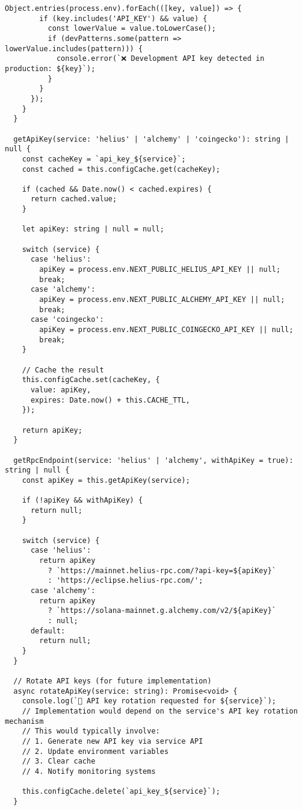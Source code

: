 \documentclass[11pt,a4paper]{article}
\begin{document}
\begin{lstlisting}[style=env, caption=API Key Security Best Practices]
      Object.entries(process.env).forEach(([key, value]) => {
        if (key.includes('API_KEY') && value) {
          const lowerValue = value.toLowerCase();
          if (devPatterns.some(pattern => lowerValue.includes(pattern))) {
            console.error(`❌ Development API key detected in production: ${key}`);
          }
        }
      });
    }
  }
  
  getApiKey(service: 'helius' | 'alchemy' | 'coingecko'): string | null {
    const cacheKey = `api_key_${service}`;
    const cached = this.configCache.get(cacheKey);
    
    if (cached && Date.now() < cached.expires) {
      return cached.value;
    }
    
    let apiKey: string | null = null;
    
    switch (service) {
      case 'helius':
        apiKey = process.env.NEXT_PUBLIC_HELIUS_API_KEY || null;
        break;
      case 'alchemy':
        apiKey = process.env.NEXT_PUBLIC_ALCHEMY_API_KEY || null;
        break;
      case 'coingecko':
        apiKey = process.env.NEXT_PUBLIC_COINGECKO_API_KEY || null;
        break;
    }
    
    // Cache the result
    this.configCache.set(cacheKey, {
      value: apiKey,
      expires: Date.now() + this.CACHE_TTL,
    });
    
    return apiKey;
  }
  
  getRpcEndpoint(service: 'helius' | 'alchemy', withApiKey = true): string | null {
    const apiKey = this.getApiKey(service);
    
    if (!apiKey && withApiKey) {
      return null;
    }
    
    switch (service) {
      case 'helius':
        return apiKey 
          ? `https://mainnet.helius-rpc.com/?api-key=${apiKey}`
          : 'https://eclipse.helius-rpc.com/';
      case 'alchemy':
        return apiKey 
          ? `https://solana-mainnet.g.alchemy.com/v2/${apiKey}`
          : null;
      default:
        return null;
    }
  }
  
  // Rotate API keys (for future implementation)
  async rotateApiKey(service: string): Promise<void> {
    console.log(`🔄 API key rotation requested for ${service}`);
    // Implementation would depend on the service's API key rotation mechanism
    // This would typically involve:
    // 1. Generate new API key via service API
    // 2. Update environment variables
    // 3. Clear cache
    // 4. Notify monitoring systems
    
    this.configCache.delete(`api_key_${service}`);
  }
  

\end{lstlisting}
\end{document}
